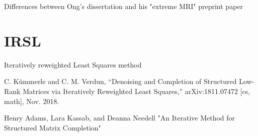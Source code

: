 Differences between Ong's dissertation and his "extreme MRI" preprint paper

\section{IRSL}
Iteratively reweighted Least Squares method

C. Kümmerle and C. M. Verdun, “Denoising and Completion of Structured Low-Rank Matrices via Iteratively Reweighted Least Squares,” arXiv:1811.07472 [cs, math], Nov. 2018.

Henry Adams, Lara Kassab, and Deanna Needell "An Iterative Method for Structured Matrix Completion"

\clearpage %